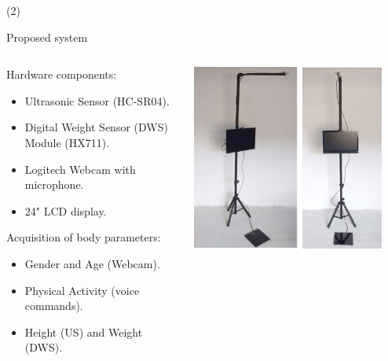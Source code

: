 \begin{frame}{ (2)}
\begin{block}{Proposed system} 
\begin{columns}
\begin{column}{0.5\textwidth}
Hardware components:
\begin{itemize}
    \item Ultrasonic Sensor (HC-SR04).
    \item Digital Weight Sensor (DWS) Module (HX711).
    \item Logitech Webcam with microphone.
    \item 24" LCD display.
\end{itemize}
Acquisition of body parameters:
\begin{itemize}
\item Gender and Age (Webcam).
\item Physical Activity (voice commands).
\item Height (US) and Weight (DWS).
\end{itemize}
\end{column}
\begin{column}{0.48\textwidth}
     \includegraphics[width=0.90\textwidth]{Figs/Bascula1}
\end{column}
\end{columns}


\end{block} 
\end{frame}


